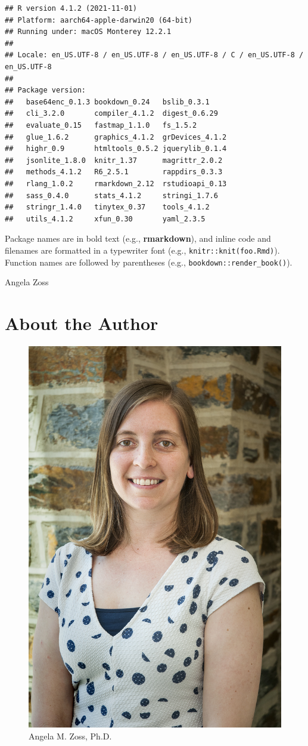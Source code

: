 \documentclass[
]{krantz}
\begin{document}
\begin{verbatim}
## R version 4.1.2 (2021-11-01)
## Platform: aarch64-apple-darwin20 (64-bit)
## Running under: macOS Monterey 12.2.1
## 
## Locale: en_US.UTF-8 / en_US.UTF-8 / en_US.UTF-8 / C / en_US.UTF-8 / en_US.UTF-8
## 
## Package version:
##   base64enc_0.1.3 bookdown_0.24   bslib_0.3.1    
##   cli_3.2.0       compiler_4.1.2  digest_0.6.29  
##   evaluate_0.15   fastmap_1.1.0   fs_1.5.2       
##   glue_1.6.2      graphics_4.1.2  grDevices_4.1.2
##   highr_0.9       htmltools_0.5.2 jquerylib_0.1.4
##   jsonlite_1.8.0  knitr_1.37      magrittr_2.0.2 
##   methods_4.1.2   R6_2.5.1        rappdirs_0.3.3 
##   rlang_1.0.2     rmarkdown_2.12  rstudioapi_0.13
##   sass_0.4.0      stats_4.1.2     stringi_1.7.6  
##   stringr_1.4.0   tinytex_0.37    tools_4.1.2    
##   utils_4.1.2     xfun_0.30       yaml_2.3.5
\end{verbatim}

Package names are in bold text (e.g., \textbf{rmarkdown}), and inline code and filenames are formatted in a typewriter font (e.g., \texttt{knitr::knit(\textquotesingle{}foo.Rmd\textquotesingle{})}). Function names are followed by parentheses (e.g., \texttt{bookdown::render\_book()}).

\begin{flushright}
Angela Zoss
\end{flushright}

\hypertarget{about-the-author}{%
\chapter*{About the Author}\label{about-the-author}}


\begin{figure}
\includegraphics[width=0.328\linewidth]{images/angela_zoss} \caption{Angela M. Zoss, Ph.D.}\label{fig:knitr-logo}
\end{figure}
\end{document}
